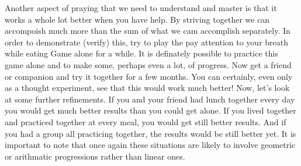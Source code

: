 \documentclass[12pt,letterpaper]{book}
\begin{document}
Another aspect of praying that we need to understand and master is that it works a whole lot better when you have help. By striving together we can accompoish much more than the sum of what we cam accomplish separately. In order to demonstrate (verify) this, try to play the pay attention to your breath while eating Game alone for a while. It is definately possible to practice this game alone and to make some, perhaps even a lot, of progress. Now get a friend or companion and try it together for a few months. You can certainly, even only as a thought experiment, see that this would work much better! Now, let's look at some further refinements. If you and your friend had lunch together every day you would get much better results than you could get alone. If you lived together and practiced together at every meal, you would get still better results. And if you had a group all practicing together, the results would be still better yet. It is important to note that once again these situations are likely to involve  geometric or arithmatic progressions rather than linear ones.
\end{document}
